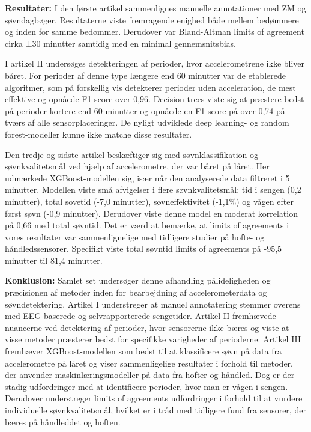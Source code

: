 \documentclass[
  10pt,
]{scrbook}
\begin{document}
\textbf{Resultater:} I den første artikel sammenlignes manuelle
annotationer med ZM og søvndagbøger. Resultaterne viste fremragende
enighed både mellem bedømmere og inden for samme bedømmer. Derudover var
Bland-Altman limits of agreement cirka ±30 minutter samtidig med en
minimal gennemsnitsbias.

I artikel II undersøges detekteringen af perioder, hvor accelerometrene
ikke bliver båret. For perioder af denne type længere end 60 minutter
var de etablerede algoritmer, som på forskellig vis detekterer perioder
uden acceleration, de mest effektive og opnåede F1-score over 0,96.
Decision trees viste sig at præstere bedst på perioder kortere end 60
minutter og opnåede en F1-score på over 0,74 på tværs af alle
sensorplaceringer. De nyligt udviklede deep learning- og random
forest-modeller kunne ikke matche disse resultater.

Den tredje og sidste artikel beskæftiger sig med søvnklassifikation og
søvnkvalitetsmål ved hjælp af accelerometre, der var båret på låret. Her
udmærkede XGBoost-modellen sig, især når den analyserede data filtreret
i 5 minutter. Modellen viste små afvigelser i flere søvnkvalitetsmål:
tid i sengen (0,2 minutter), total sovetid (-7,0 minutter),
søvneffektivitet (-1,1\%) og vågen efter først søvn (-0,9 minutter).
Derudover viste denne model en moderat korrelation på 0,66 med total
søvntid. Det er værd at bemærke, at limits of agreements i vores
resultater var sammenlignelige med tidligere studier på hofte- og
håndledssensorer. Specifikt viste total søvntid limits of agreements på
-95,5 minutter til 81,4 minutter.

\textbf{Konklusion:} Samlet set undersøger denne afhandling
pålideligheden og præcisionen af metoder inden for bearbejdning af
accelerometerdata og søvndetektering. Artikel I understreger at manuel
annotatering stemmer overens med EEG-baserede og selvrapporterede
sengetider. Artikel II fremhævede nuancerne ved detektering af perioder,
hvor sensorerne ikke bæres og viste at visse metoder præsterer bedst for
specifikke varigheder af perioderne. Artikel III fremhæver
XGBoost-modellen som bedst til at klassificere søvn på data fra
accelerometre på låret og viser sammenligelige resultater i forhold til
metoder, der anvender maskinlæringsmodeller på data fra hofter og
håndled. Dog er der stadig udfordringer med at identificere perioder,
hvor man er vågen i sengen. Derudover understreger limits of agreements
udfordringer i forhold til at vurdere individuelle søvnkvalitetsmål,
hvilket er i tråd med tidligere fund fra sensorer, der bæres på
håndleddet og hoften.
\end{document}

